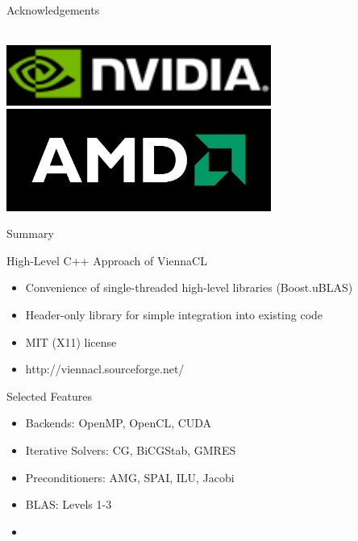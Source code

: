 \begin{frame}{Acknowledgements}
\begin{minipage}{0.4\textwidth}
  \vspace*{0.2cm} \\
  \includegraphics[width=0.65\textwidth]{figs/nvidia_logo_black.png}
  \vspace*{0.2cm} \\
  \includegraphics[width=0.65\textwidth]{figs/amd-logo.png}
 \end{minipage}

\end{frame}



\begin{frame}{Summary}
 
 \begin{block}{High-Level C++ Approach of ViennaCL}
  \begin{itemize}
   \item Convenience of single-threaded high-level libraries (Boost.uBLAS)
   \item Header-only library for simple integration into existing code
   \item MIT (X11) license
   \item \centering http://viennacl.sourceforge.net/
  \end{itemize}
 \end{block}

 \begin{block}{Selected Features}
  \begin{itemize}
   \item Backends: OpenMP, OpenCL, CUDA
   \item Iterative Solvers: CG, BiCGStab, GMRES
   \item Preconditioners: AMG, SPAI, ILU, Jacobi
   \item BLAS: Levels 1-3
   \item 
  \end{itemize}
 \end{block}

\end{frame}